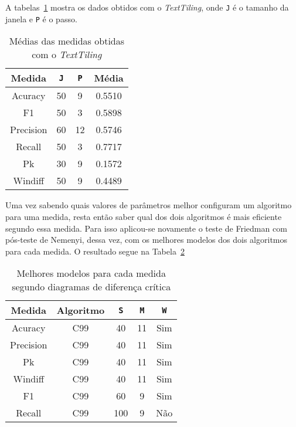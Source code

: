 A tabelas~\ref{tab:mediasTextTiling} mostra os dados obtidos com o \textit{TextTiling}, onde \texttt{J} é o tamanho da janela e \texttt{P} é o passo.

\begin{table}[!h]
	\centering

	\begin{tabular}{|c|c|c|c|}
	
		\hline
		Medida & \texttt{J} & \texttt{P} & \textbf{Média}\\		
		\hline

		Acuracy		& 50 & 9 	& 0.5510 \\ \hline	
		F1			& 50 & 3 	& 0.5898 \\ \hline	
		Precision	& 60 & 12 	& 0.5746 \\ \hline			
		Recall		& 50 & 3 	& 0.7717 \\ \hline		
		Pk			& 30 & 9 	& 0.1572 \\ \hline	
		Windiff		& 50 & 9 	& 0.4489 \\ \hline		

		
	\end{tabular}
	
	\caption{Médias das medidas obtidas com o \textit{TextTiling}}
	\label{tab:mediasTextTiling}
\end{table}


Uma vez sabendo quais valores de parâmetros melhor configuram um algoritmo para uma medida, resta então saber qual dos dois algoritmos é mais eficiente segundo essa medida. Para isso aplicou-se novamente o teste de Friedman com pós-teste de Nemenyi, dessa vez, com os melhores modelos dos dois algoritmos para cada medida. O resultado segue na Tabela~\ref{tab:melhoresmodelos}

\begin{table}[!h]
	\centering
	
	\begin{tabular}{|c|c|c|c|c|}

		\hline
		Medida & Algoritmo & \texttt{S} & \texttt{M} & \texttt{W}\\		
		\hline
		
	
		Acuracy		& C99 & 40 	& 11	& Sim \\ \hline
		Precision	& C99 & 40 	& 11	& Sim \\ \hline
		Pk			& C99 & 40 	& 11	& Sim \\ \hline
		Windiff		& C99 & 40 	& 11	& Sim \\ \hline
		F1			& C99 & 60 	& 9		& Sim \\ \hline
		Recall		& C99 & 100 & 9		& Não \\ \hline
 	
	
	\end{tabular}

	\caption{Melhores modelos para cada medida segundo diagramas de diferença crítica}
	\label{tab:melhoresmodelos}	
	
\end{table}


